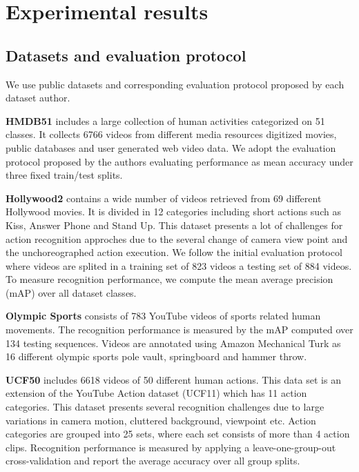 \section{Experimental results}
\label{results}
\subsection{Datasets and evaluation protocol}
\label{subsec:datasets}
We use public datasets and corresponding evaluation protocol proposed by each dataset author. 

\textbf{HMDB51} \cite{kuehne2011} includes a large collection of human activities categorized on 51 classes. It collects 6766 videos from different media resources \ie digitized movies, public databases and user generated web video data. We adopt the evaluation protocol proposed by the authors evaluating performance as mean accuracy under three fixed train/test splits.

\textbf{Hollywood2} \cite{marszalek2009} contains a wide number of videos retrieved from 69 different Hollywood movies. It is divided in 12 categories including short actions such as Kiss, Answer Phone and Stand Up. This dataset presents a lot of challenges for action recognition approches due to the several change of camera view point and the unchoreographed action execution. We follow the initial evaluation protocol where videos are splited in a training set of 823 videos a testing set of 884 videos. To measure recognition performance, we compute the mean average precision (mAP) over all dataset 
classes.

\textbf{Olympic Sports} \cite{niebles2010} consists of 783 YouTube videos of sports related human movements. The recognition performance is measured 
by the mAP computed over 134 testing sequences. Videos are annotated using Amazon Mechanical Turk as 16 different olympic sports \eg pole vault, springboard and hammer throw.

\textbf{UCF50} \cite{reddy2013} includes 6618 videos of 50 different human actions. This data set is an extension of the YouTube Action dataset (UCF11) which has 11 action categories. This dataset presents several recognition challenges due to large variations in camera motion, cluttered background, viewpoint etc. Action categories are grouped into 25 sets, where each set consists of more than 4 action clips. Recognition performance is measured by applying a leave-one-group-out cross-validation and report the average accuracy over all group splits. 

